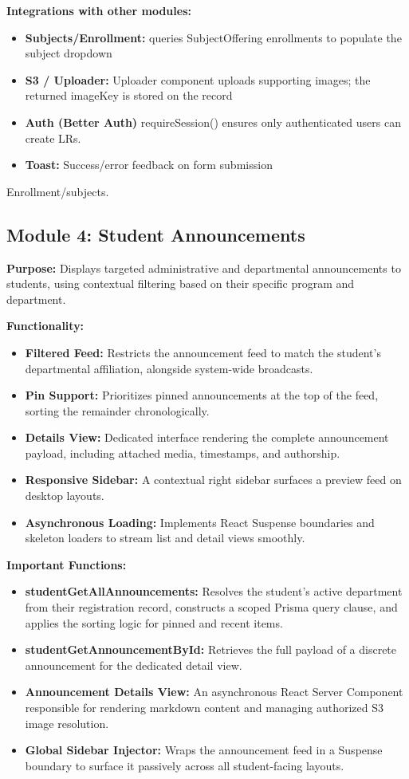 \textbf{Integrations with other modules:}
\begin{itemize}
    \item \textbf{Subjects/Enrollment:} queries SubjectOffering enrollments to populate the subject dropdown
    \item \textbf{S3 / Uploader:} Uploader component uploads supporting images; the returned imageKey is stored on the record
    \item \textbf{Auth (Better Auth)} requireSession() ensures only authenticated users can create LRs.
    \item \textbf{Toast:} Success/error feedback on form submission
\end{itemize}
Enrollment/subjects.

\subsection{Module 4: Student Announcements}
\textbf{Purpose:}
Displays targeted administrative and departmental announcements to students, using contextual filtering based on their specific program and department.

\textbf{Functionality:}
\begin{itemize}
    \item \textbf{Filtered Feed:} Restricts the announcement feed to match the student's departmental affiliation, alongside system-wide broadcasts.
    \item \textbf{Pin Support:} Prioritizes pinned announcements at the top of the feed, sorting the remainder chronologically.
    \item \textbf{Details View:} Dedicated interface rendering the complete announcement payload, including attached media, timestamps, and authorship.
    \item \textbf{Responsive Sidebar:} A contextual right sidebar surfaces a preview feed on desktop layouts.
    \item \textbf{Asynchronous Loading:} Implements React Suspense boundaries and skeleton loaders to stream list and detail views smoothly.
\end{itemize}

\textbf{Important Functions:}

\begin{itemize}
    \item \textbf{studentGetAllAnnouncements:} Resolves the student's active department from their registration record, constructs a scoped Prisma query clause, and applies the sorting logic for pinned and recent items.
    \item \textbf{studentGetAnnouncementById:} Retrieves the full payload of a discrete announcement for the dedicated detail view.
    \item \textbf{Announcement Details View:} An asynchronous React Server Component responsible for rendering markdown content and managing authorized S3 image resolution.
    \item \textbf{Global Sidebar Injector:} Wraps the announcement feed in a Suspense boundary to surface it passively across all student-facing layouts.
\end{itemize}


